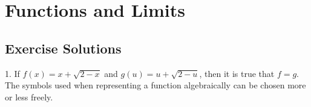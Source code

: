 \documentclass[10pt]{article}
\begin{document}
\section{Functions and Limits}
\subsection{Exercise Solutions}

1. If \(f(x) = x + \sqrt{2 - x}\) and \(g(u) = u + \sqrt{2 - u}\), then it is true that \(f = g\). The symbols used when representing a function algebraically can be chosen more or less freely.
\end{document}
